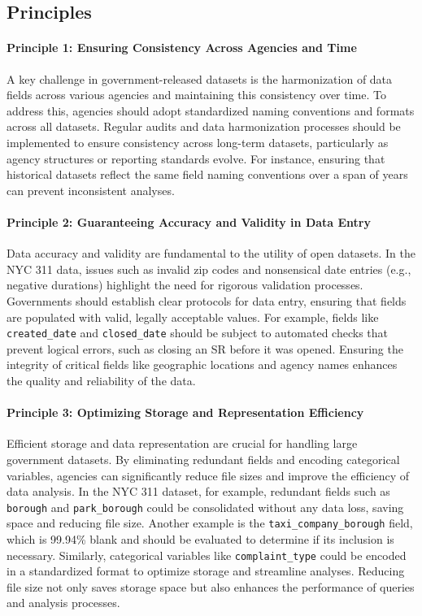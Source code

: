 \documentclass[linenumber]{jdsart}
\begin{document}
\subsection{Principles}
\paragraph{Principle 1: Ensuring Consistency Across Agencies and Time}
A key challenge in government-released datasets is the 
harmonization of data fields across various agencies and 
maintaining this consistency over time. To address this, agencies should adopt 
standardized naming conventions and formats across all datasets. 
Regular audits and data harmonization processes should be 
implemented to ensure consistency across long-term datasets, 
particularly as agency structures or reporting standards evolve. 
For instance, ensuring that historical datasets reflect the same 
field naming conventions over a span of years can prevent 
inconsistent analyses.

\paragraph{Principle 2: Guaranteeing Accuracy and Validity in Data Entry}
Data accuracy and validity are fundamental to the utility of 
open datasets. In the NYC 311 data, issues such as 
invalid zip codes and 
nonsensical date entries (e.g., negative durations) highlight the need 
for rigorous validation processes. Governments should establish 
clear protocols for data entry, ensuring that fields are populated with 
valid, legally acceptable values. For example, fields like 
\texttt{created\_date} and \texttt{closed\_date} should be subject to 
automated checks that prevent logical errors, such as closing an 
SR before it was opened. Ensuring the integrity of critical fields 
like geographic locations and agency names enhances the quality 
and reliability of the data.

\paragraph{Principle 3: Optimizing Storage and Representation Efficiency}
Efficient storage and data representation are crucial for handling 
large government datasets. By eliminating redundant fields and 
encoding categorical variables, agencies can significantly reduce 
file sizes and improve the efficiency of data analysis. In the NYC 
311 dataset, for example, redundant fields such as \texttt{borough} 
and \texttt{park\_borough} could be consolidated without any data 
loss, saving space and reducing file size. Another 
example is the \texttt{taxi\_company\_borough} field, which is 99.94\% 
blank and should be evaluated to determine if its inclusion is 
necessary. Similarly, categorical variables like \texttt{complaint\_type} 
could be encoded in a standardized format to optimize storage and 
streamline analyses. Reducing file size not only saves storage space 
but also enhances the performance of queries and analysis processes.
\end{document}
